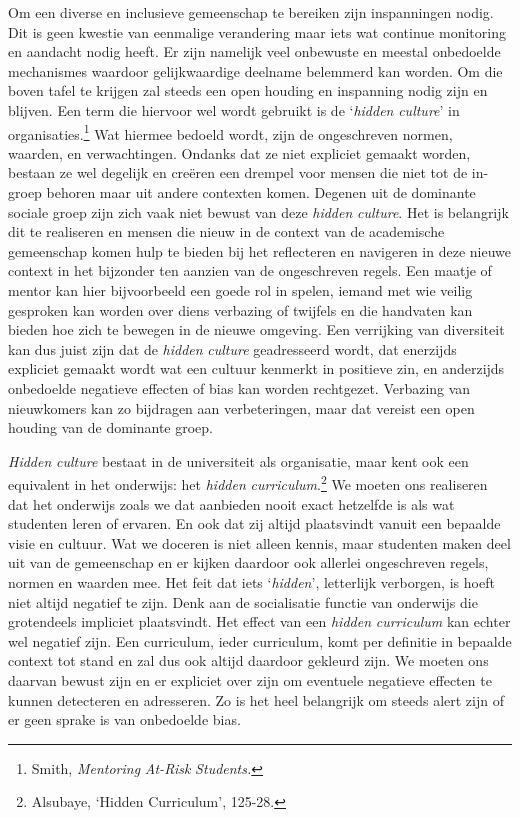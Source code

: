 \documentclass[smallauthor, chapterhaspagenum, nochapterinheader, pagenuminheader,  bigchapnum,medium2, tocpages, garamond, titleinheader]{jote-book}
\begin{document}
	Om een diverse en inclusieve gemeenschap te bereiken zijn inspanningen nodig. Dit is geen kwestie van eenmalige verandering maar iets wat continue monitoring en aandacht nodig heeft. Er zijn namelijk veel onbewuste en meestal onbedoelde mechanismes waardoor gelijkwaardige deelname belemmerd kan worden. Om die boven tafel te krijgen zal steeds een open houding en inspanning nodig zijn en blijven. Een term die hiervoor wel wordt gebruikt is de ‘\emph{hidden}\emph{ culture}' in organisaties.\footnote{Smith, \emph{Mentoring}\emph{ At-Risk }\emph{Students}\emph{.}} Wat hiermee bedoeld wordt, zijn de ongeschreven normen, waarden, en verwachtingen. Ondanks dat ze niet expliciet gemaakt worden, bestaan ze wel degelijk en creëren een drempel voor mensen die niet tot de in-groep behoren maar uit andere contexten komen. Degenen uit de dominante sociale groep zijn zich vaak niet bewust van deze \emph{hidden}\emph{ culture}. Het is belangrijk dit te realiseren en mensen die nieuw in de context van de academische gemeenschap komen hulp te bieden bij het reflecteren en navigeren in deze nieuwe context in het bijzonder ten aanzien van de ongeschreven regels. Een maatje of mentor kan hier bijvoorbeeld een goede rol in spelen, iemand met wie veilig gesproken kan worden over diens verbazing of twijfels en die handvaten kan bieden hoe zich te bewegen in de nieuwe omgeving. Een verrijking van diversiteit kan dus juist zijn dat de \emph{hidden}\emph{ culture} geadresseerd wordt, dat enerzijds expliciet gemaakt wordt wat een cultuur kenmerkt in positieve zin, en anderzijds onbedoelde negatieve effecten of bias kan worden rechtgezet. Verbazing van nieuwkomers kan zo bijdragen aan verbeteringen, maar dat vereist een open houding van de dominante groep.



	\emph{Hidden}\emph{ culture} bestaat in de universiteit als organisatie, maar kent ook een equivalent in het onderwijs: het \emph{hidden} \emph{curriculum}.\footnote{Alsubaye, ‘Hidden Curriculum', 125-28.} We moeten ons realiseren dat het onderwijs zoals we dat aanbieden nooit exact hetzelfde is als wat studenten leren of ervaren. En ook dat zij altijd plaatsvindt vanuit een bepaalde visie en cultuur. Wat we doceren is niet alleen kennis, maar studenten maken deel uit van de gemeenschap en er kijken daardoor ook allerlei ongeschreven regels, normen en waarden mee. Het feit dat iets ‘\emph{hidden}', letterlijk verborgen, is hoeft niet altijd negatief te zijn. Denk aan de socialisatie functie van onderwijs die grotendeels impliciet plaatsvindt. Het effect van een \emph{hidden}\emph{ curriculum} kan echter wel negatief zijn. Een curriculum, ieder curriculum, komt per definitie in bepaalde context tot stand en zal dus ook altijd daardoor gekleurd zijn. We moeten ons daarvan bewust zijn en er expliciet over zijn om eventuele negatieve effecten te kunnen detecteren en adresseren. Zo is het heel belangrijk om steeds alert zijn of er geen sprake is van onbedoelde bias.
\end{document}
